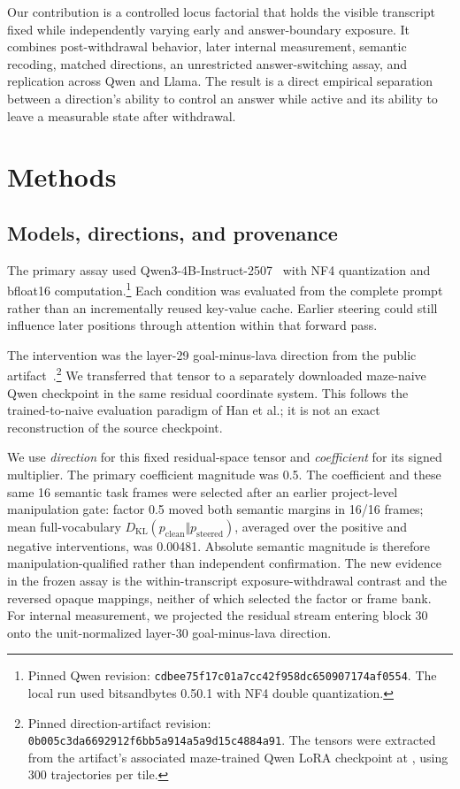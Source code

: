 \documentclass[10pt,twocolumn]{article}
\begin{document}
Our contribution is a controlled locus factorial that holds the visible transcript fixed while independently varying early and answer-boundary exposure. It combines post-withdrawal behavior, later internal measurement, semantic recoding, matched directions, an unrestricted answer-switching assay, and replication across Qwen and Llama. The result is a direct empirical separation between a direction's ability to control an answer while active and its ability to leave a measurable state after withdrawal.

\section{Methods}

\subsection{Models, directions, and provenance}

The primary assay used Qwen3-4B-Instruct-2507~\cite{qwen2025} with NF4 quantization and bfloat16 computation.\footnote{Pinned Qwen revision: \nolinkurl{cdbee75f17c01a7cc42f958dc650907174af0554}. The local run used bitsandbytes 0.50.1 with NF4 double quantization.} Each condition was evaluated from the complete prompt rather than an incrementally reused key-value cache. Earlier steering could still influence later positions through attention within that forward pass.

The intervention was the layer-29 goal-minus-lava direction from the public  artifact~\cite{africa2026}.\footnote{Pinned direction-artifact revision: \nolinkurl{0b005c3da6692912f6bb5a914a5a9d15c4884a91}. The tensors were extracted from the artifact's associated maze-trained Qwen LoRA checkpoint at , using 300 trajectories per tile.} We transferred that tensor to a separately downloaded maze-naive Qwen checkpoint in the same residual coordinate system. This follows the trained-to-naive evaluation paradigm of Han et al.; it is not an exact reconstruction of the source checkpoint.

We use \emph{direction} for this fixed residual-space tensor and \emph{coefficient} for its signed multiplier. The primary coefficient magnitude was 0.5. The coefficient and these same 16 semantic task frames were selected after an earlier project-level manipulation gate: factor 0.5 moved both semantic margins in 16/16 frames; mean full-vocabulary $D_{\mathrm{KL}}(p_{\mathrm{clean}}\Vert p_{\mathrm{steered}})$, averaged over the positive and negative interventions, was 0.00481. Absolute semantic magnitude is therefore manipulation-qualified rather than independent confirmation. The new evidence in the frozen assay is the within-transcript exposure-withdrawal contrast and the reversed opaque mappings, neither of which selected the factor or frame bank. For internal measurement, we projected the residual stream entering block 30 onto the unit-normalized layer-30 goal-minus-lava direction.
\end{document}
